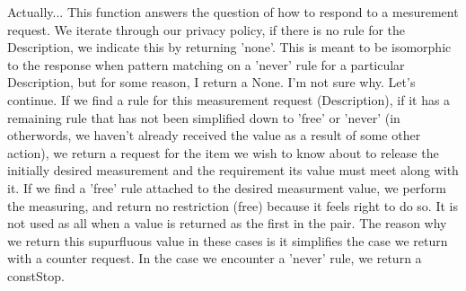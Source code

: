 \documentclass[12pt]{report}
\begin{document}
Actually...
This function answers the question of how to respond to a mesurement request.
We iterate through our privacy policy, if there is no rule for the Description, we indicate
this by returning 'none'. This is meant to be isomorphic to the response when pattern matching 
on a 'never' rule for a particular Description, but for some reason, I return a None. I'm not sure why.
Let's continue.
If we find a rule for this measurement request (Description), if it has a remaining rule that has not
been simplified down to 'free' or 'never' (in otherwords, we haven't already received the value as a result
of some other action), we return a request for the item we wish to know about to release the initially desired
measurement and the requirement its value must meet along with it. If we find a 'free' rule attached to the 
desired measurment value, we perform the measuring, and return no restriction (free) because it  feels right to do so. It is not used as all when a value is returned as the first in the pair. The reason why we return this supurfluous value in these cases is it simplifies the case we return with a counter request.
In the case we encounter a 'never' rule, we return a constStop. 
\end{document}
